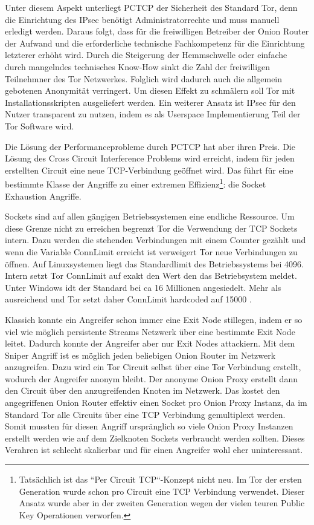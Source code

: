 \documentclass[fleqn,envcountsame,runningheads,10pt,a4paper]{llncs}
\begin{document}
Unter diesem Aspekt unterliegt PCTCP der Sicherheit des Standard Tor, denn die Einrichtung des IPsec benötigt Administratorrechte und muss manuell erledigt werden. Daraus folgt, dass für die freiwilligen Betreiber der Onion Router der Aufwand und die erforderliche technische Fachkompetenz für die Einrichtung letzterer erhöht wird. Durch die Steigerung der Hemmschwelle oder einfache durch mangelndes technisches Know-How sinkt die Zahl der freiwilligen Teilnehmner des Tor Netzwerkes. Folglich wird dadurch auch die allgemein gebotenen Anonymität verringert. Um diesen Effekt zu schmälern soll Tor mit Installationsskripten ausgeliefert werden. Ein weiterer Ansatz ist IPsec für den Nutzer transparent zu nutzen, indem es als Userspace Implementierung Teil der Tor Software wird.


Die Lösung der Performanceprobleme durch PCTCP hat aber ihren Preis. Die Lösung des Cross Circuit Interference Problems wird erreicht, indem für jeden erstellten Circuit eine neue TCP-Verbindung geöffnet wird. Das führt für eine bestimmte Klasse der Angriffe zu einer extremen Effizienz\footnote{Tatsächlich ist das ``Per Circuit TCP``-Konzept nicht neu. Im Tor der ersten Generation wurde schon pro Circuit eine TCP Verbindung verwendet. Dieser Ansatz wurde aber in der zweiten Generation wegen der vielen teuren Public Key Operationen verworfen.\cite{tor}}: die Socket Exhaustion Angriffe. 

Sockets sind auf allen gängigen Betriebssystemen eine endliche Ressource. Um diese Grenze nicht zu erreichen begrenzt Tor die Verwendung der TCP Sockets intern. Dazu werden die stehenden Verbindungen mit einem Counter gezählt und wenn die Variable ConnLimit erreicht ist verweigert Tor neue Verbindungen zu öffnen. Auf Linuxsystemen liegt das Standardlimit des Betriebssystems bei 4096. Intern setzt Tor ConnLimit auf exakt den Wert den das Betriebsystem meldet. Unter Windows idt der Standard bei ca 16 Millionen angesiedelt. Mehr als ausreichend und Tor setzt daher ConnLimit hardcoded auf 15000 \cite{imux}.

Klassich konnte ein Angreifer schon immer eine Exit Node stillegen, indem er so viel wie möglich persistente Streams Netzwerk über eine bestimmte Exit Node leitet. Dadurch konnte der Angreifer aber nur Exit Nodes attackiern. Mit dem Sniper Angriff \cite{sniper} ist es möglich jeden beliebigen Onion Router im Netzwerk anzugreifen. Dazu wird ein Tor Circuit selbst über eine Tor Verbindung erstellt, wodurch der Angreifer anonym bleibt. Der anonyme Onion Proxy erstellt dann den Circuit über den anzugreifenden Knoten im Netzwerk. Das kostet den angegriffenen Onion Router effektiv einen Socket pro Onion Proxy Instanz, da im Standard Tor alle Circuits über eine TCP Verbindung gemultiplext werden. Somit mussten für diesen Angriff urspränglich so viele Onion Proxy Instanzen erstellt werden wie auf dem Zielknoten Sockets verbraucht werden sollten. Dieses Verahren ist schlecht skalierbar und für einen Angreifer wohl eher uninteressant.
\end{document}
